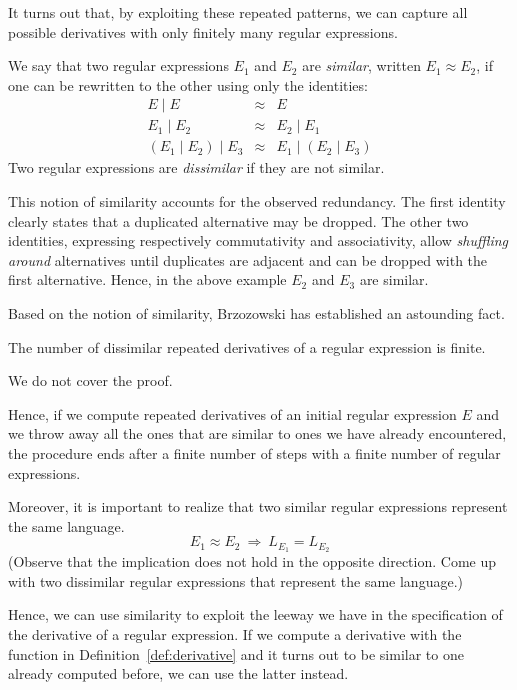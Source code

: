It turns out that, by exploiting these repeated patterns, we can capture all
possible derivatives with only finitely many regular expressions.
\begin{definition}
We say that two regular expressions $E_1$ and $E_2$ are \emph{similar}, written
$E_1 \approx E_2$, if one can be rewritten to the other using only the identities:
\begin{eqnarray*}
E \mid E & \approx & E \\
E_1 \mid E_2 & \approx & E_2 \mid E_1 \\
(E_1 \mid E_2) \mid E_3 & \approx & E_1 \mid (E_2 \mid E_3)
\end{eqnarray*}
Two regular expressions are \emph{dissimilar} if they are not similar.
\end{definition}
This notion of similarity accounts for the observed redundancy. The first
identity clearly states that a duplicated alternative may be dropped. 
The other two identities, expressing respectively commutativity and associativity,
allow \emph{shuffling around} alternatives until duplicates are adjacent and
can be dropped with the first alternative.
Hence, in the above example $E_2$ and $E_3$ are similar.

Based on the notion of similarity, Brzozowski has established an astounding fact.
\begin{theorem}
The number of dissimilar repeated derivatives of a regular expression is finite.
\end{theorem} 
We do not cover the proof.

Hence, if we compute repeated derivatives of an initial regular expression $E$
and we throw away all the ones that are similar to ones we have already
encountered, the procedure ends after a finite number of steps with a finite
number of regular expressions.

Moreover, it is important to realize that two similar regular expressions
represent the same language.
\begin{equation*}
E_1 \approx E_2 ~\Rightarrow~ L_{E_1} = L_{E_2} 
\end{equation*}
(Observe that the implication does not hold in the opposite direction. Come up
with two dissimilar regular expressions that represent the same language.)

Hence, we can use similarity to exploit the leeway we have in the specification
of the derivative of a regular expression. If we compute a derivative with
the function in Definition~\ref{def:derivative} and it turns out to be similar
to one already computed before, we can use the latter instead.

